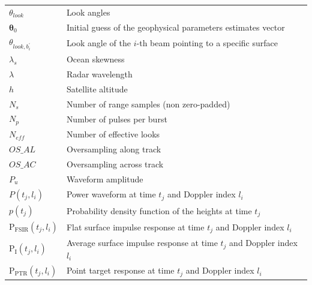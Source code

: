 \documentclass[11pt,a4paper]{article}
\begin{document}
\begin{table}[ht!]
\hspace{-0.2cm}\begin{tabular}{m{}m{}}

$\theta_{look}$ & Look angles \\

$\bm{\theta}_0$ & Initial guess of the geophysical parameters estimates vector \\

$\theta_{look, b_i^\prime}$ & Look angle of the $i$-th beam pointing to a specific surface \\

$\lambda_s$ & Ocean skewness \\

$\lambda$ & Radar wavelength\\

$h$ & Satellite altitude \\


$N_s$ & Number of range samples (non zero-padded)\\

$N_p$ & Number of pulses per burst  \\

$N_{eff}$ & Number of effective looks \\   


$OS\_AL$ & Oversampling along track \\

$OS\_AC$ & Oversampling across track \\


$P_u$ & Waveform amplitude \\

$P(t_j, l_i)$ & Power waveform at time $t_j$ and Doppler index $l_i$ \\

$p(t_j)$ & Probability density function of the heights at time $t_j$ \\

$\text{P}_\text{FSIR}(t_j, l_i)$ & Flat surface impulse response at time $t_j$ and Doppler index $l_i$\\

$\text{P}_\text{I}(t_j, l_i)$ & Average surface impulse response at time $t_j$ and Doppler index $l_i$\\

$\text{P}_\text{PTR}(t_j, l_i)$ & Point target response at time $t_j$ and Doppler index $l_i$ \\


\end{tabular}
\end{table}
\end{document}
